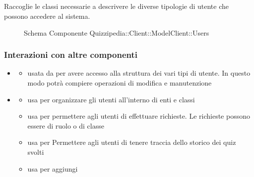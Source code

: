 \subsection{}
Raccoglie le classi necessarie a descrivere le diverse tipologie di utente che possono accedere al sistema.
\begin{figure}[H]
\centering
\noindent{}
\caption[Schema Componente Quizzipedia::Client::ModelClient::Users]{Schema Componente Quizzipedia::Client::ModelClient::Users}
\end{figure}
\subsubsection{Interazioni con altre componenti}
\begin{itemize}
\item {}
\begin{itemize}
\item usata da  per avere accesso alla struttura dei vari tipi di utente. In questo modo potrà compiere operazioni di modifica e manutenzione
\end{itemize}
\item {}
\begin{itemize}
\item usa  per organizzare gli utenti all'interno di enti e classi
\item usa  per permettere agli utenti di effettuare richieste. Le richieste possono essere di ruolo o di classe
\item usa  per Permettere agli utenti di tenere traccia dello storico dei quiz svolti
\item usa  per aggiungi
\end{itemize}
\end{itemize}
